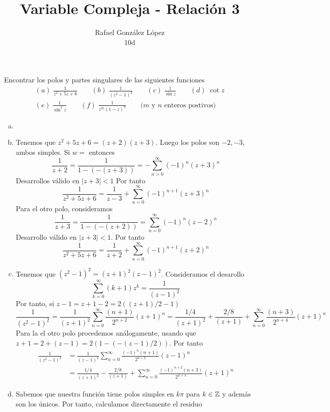 \documentclass[twoside]{article}
\begin{document}
\title{Variable Compleja - Relación 3}
\author{Rafael González López\\
10d}
\maketitle
\begin{ejercicio}{1}
Encontrar los polos y partes singulares de las siguientes funciones
\begin{gather*}
(a)\; \frac{1}{z^2+5z+6} \qquad (b)\; \frac{1}{(z^2-1)^2} \qquad (c)\; \frac{1}{\sin z} \qquad (d)\; \cot z\\
(e)\; \frac{1}{\sin^2 z}\qquad (f)\; \frac{1}{z^m(1-z)^n} \qquad\text{($m$ y $n$ enteros postivos)}
\end{gather*}
\end{ejercicio}
\begin{solucion}
\begin{enumerate}[(a)]
\item[]
\item Tenemos que $z^2+5z+6=(z+2)(z+3)$. Luego los polos son $-2,-3$, ambos simples. Si $w=$ entonces
$$
\frac{1}{z+2}=\frac{1}{1-(-(z+3))} = - \sum_{n=0}^\infty (-1)^n(z+3)^n
$$
Desarrollos válido en $|z+3|<1$ Por tanto
$$
\frac{1}{z^2+5z+6} = \frac{1}{z-3} + \sum_{n=0}^\infty (-1)^{n+1}(z+3)^n
$$
Para el otro polo, consideramos
$$
\frac{1}{z+3} = \frac{1}{1-(-(z+2))} = \sum_{n=0}^\infty (-1)^n(z-2)^n
$$
Desarrollo válido en $|z+3|<1$. Por tanto
$$
\frac{1}{z^2+5z+6} = \frac{1}{z+2} + \sum_{n=0}^\infty (-1)^{n+1}(z+2)^n
$$
\newpage
\item Tenemos que $(z^2-1)^2 = (z+1)^2(z-1)^2$. Consideramos el desarollo
$$
\sum_{k=0}^\infty (k+1)z^k = \frac{1}{(z-1)^2}
$$
Por tanto, si $z-1 = z+1 -2 = {2((z+1)/2-1)}$
$$\frac{1}{(z^2-1)^2}=  \frac{1}{(z+1)^2} \sum_{n=0}^\infty\frac{(n+1)}{2^{n+2}}(z+1)^n = \frac{1/4}{(z+1)^{2}}+\frac{2/8}{(z+1)} + \sum_{n=0}^\infty \frac{(n+3)}{2^{n+4}}(z+1)^{n} 
$$
Para la el otro polo procedemos análogamente, usando que $z+1=2+(z-1) = 2(1-(-(z-1)/2))$. Por tanto
\begin{align*}
\frac{1}{(z^2-1)^2}&=  \frac{1}{(z-1)^2} \sum_{n=0}^\infty\frac{(-1)^n(n+1)}{2^{n+2}}(z-1)^n\\
&= \frac{1/4}{(z+1)^{2}}-\frac{2/8}{(z+1)} + \sum_{n=0}^\infty \frac{(-1)^{n+2}(n+3)}{2^{n+4}}(z+1)^{n}
\end{align*}
\item Sabemos que nuestra función tiene polos simples en $k\pi$ para $k\in \mathbb{Z}$ y además son los únicos.
Por tanto, calculamos directamente el residuo

\end{enumerate}
\end{solucion}
\end{document}
